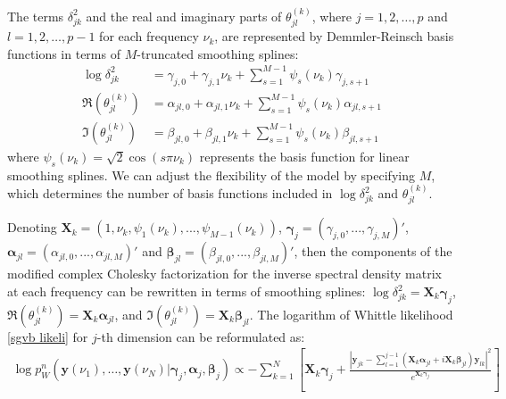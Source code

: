 \documentclass[12pt,a4paper]{article}
\begin{document}
The terms $\delta_{jk}^2$ and the real and imaginary parts of $\theta_{jl}^{(k)}$, where $j = 1,2, \ldots, p$ and $l = 1,2, \ldots, p-1$ for each frequency $\nu_k$, are represented by Demmler-Reinsch basis functions in terms of $M$-truncated smoothing splines:
\[
\begin{aligned}
\log \delta_{jk}^2 &= \gamma_{j,0} + \gamma_{j,1}\nu_k + \sum_{s=1}^{M-1}\psi_s(\nu_k)\gamma_{j,s+1} \\
\Re(\theta_{jl}^{(k)}) &= \alpha_{jl,0} + \alpha_{jl,1}\nu_k + \sum_{s=1}^{M-1}\psi_s(\nu_k)\alpha_{jl,s+1} \\
\Im(\theta_{jl}^{(k)}) &= \beta_{jl,0} + \beta_{jl,1}\nu_k + \sum_{s=1}^{M-1}\psi_s(\nu_k)\beta_{jl,s+1}
\end{aligned}
\]
where $\psi_s(\nu_k) = \sqrt{2} \cos(s\pi\nu_k)$ represents the basis function for linear smoothing splines. We can adjust the flexibility of the model by specifying $M$, which determines the number of basis functions included in $\log \delta_{jk}^2$ and $\theta_{jl}^{(k)}$.

Denoting $\mathbf{X}_k = (1, \nu_k, \psi_1(\nu_k),...,\psi_{M-1}(\nu_k))$, $\bm{\gamma}_j = (\gamma_{j,0},...,\gamma_{j,M})'$, $\bm{\alpha}_{jl} = (\alpha_{jl,0},...,\alpha_{jl,M})'$ and $\bm{\beta}_{jl} = (\beta_{jl,0},...,\beta_{jl,M})'$, then the components of the modified complex Cholesky factorization for the inverse spectral density matrix at each frequency can be rewritten in terms of smoothing splines: $\log\delta_{jk}^2 = \mathbf{X}_k \bm{\gamma}_j$, $\Re(\theta_{jl}^{(k)}) = \mathbf{X}_k \bm{\alpha}_{jl}$, and $\Im(\theta_{jl}^{(k)}) = \mathbf{X}_k \bm{\beta}_{jl}$. The logarithm of Whittle likelihood  \ref{sgvb likeli} for $j$-th dimension can be reformulated as:
\begin{align}
\log p^{n}_W(\mathbf{y}(\nu_1), \ldots, \mathbf{y}(\nu_N)|\bm{\gamma}_j, \bm{\alpha}_j, \bm{\beta}_j)
\propto - \sum_{k=1}^{N} \left[\mathbf{X}_k \bm{\gamma}_j + \frac{ \left|\mathbf{y}_{jk} - \sum_{l=1}^{j-1}(\mathbf{X}_k \bm{\alpha}_{jl} + i\mathbf{X}_k \bm{\beta}_{jl}) \mathbf{y}_{lk} \right|^2}{e^{\mathbf{X}_k \bm{\gamma}_j}} \right]
\label{loglike}
\end{align}
\end{document}
